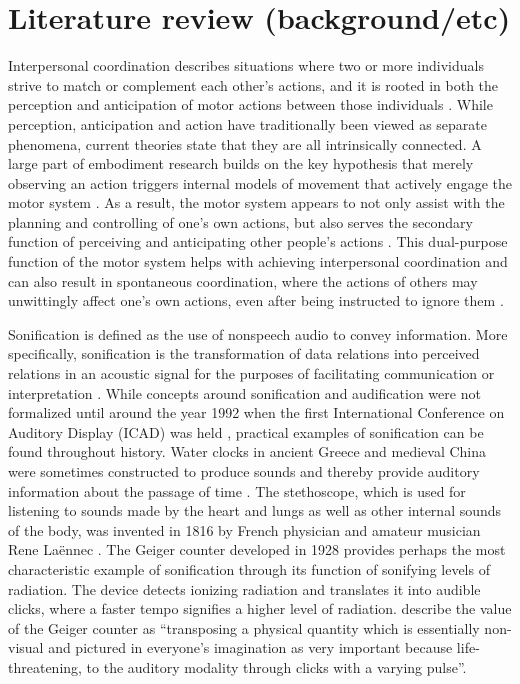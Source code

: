 \documentclass[10pt,a4paper,onecolumn]{article}
\begin{document}
\hypertarget{literature-review-backgroundetc}{%
\section{Literature review (background/etc)}\label{literature-review-backgroundetc}}

Interpersonal coordination describes situations where two or more individuals strive to match or complement each other's actions,
and it is rooted in both the perception and anticipation of motor actions between those individuals \autocite{gerdschmitzSoundJoinedActions2017}.
While perception, anticipation and action have traditionally been viewed as separate phenomena, current theories state that they are all intrinsically connected.
A large part of embodiment research builds on the key hypothesis that merely observing an action triggers internal models of
movement that actively engage the motor system \autocite{gerdschmitzSoundJoinedActions2017}.
As a result, the motor system appears to not only assist with the planning and controlling of one's own actions,
but also serves the secondary function of perceiving and anticipating other people's actions \autocite{gerdschmitzSoundJoinedActions2017}.
This dual-purpose function of the motor system helps with achieving interpersonal coordination and can also result in spontaneous coordination,
where the actions of others may unwittingly affect one's own actions, even after being instructed to ignore them \autocite{demosRockingBeatEffects2012}.

Sonification is defined as the use of nonspeech audio to convey information.
More specifically, sonification is the transformation of data relations into perceived relations in an acoustic
signal for the purposes of facilitating communication or interpretation \autocite{kramerSonificationReportStatus1999}.
While concepts around sonification and audification were not formalized until around the year 1992 when the first
International Conference on Auditory Display (ICAD) was held \autocite{dubusSonificationPhysicalQuantities2011}, practical examples of sonification can
be found throughout history. Water clocks in ancient Greece and medieval China were sometimes constructed to
produce sounds and thereby provide auditory information about the passage of time \autocite{dubusSonificationPhysicalQuantities2011}.
The stethoscope, which is used for listening to sounds made by the heart and lungs as well as other internal
sounds of the body, was invented in 1816 by French physician and amateur musician Rene Laënnec \autocite{roguinReneTheophileHyacinthe2006}.
The Geiger counter developed in 1928 provides perhaps the most characteristic example of sonification through
its function of sonifying levels of radiation. The device detects ionizing radiation and translates it into audible clicks,
where a faster tempo signifies a higher level of radiation. \textcite{dubusSonificationPhysicalQuantities2011} describe the value of the Geiger
counter as ``transposing a physical quantity which is essentially non-visual and pictured in everyone's imagination
as very important because life-threatening, to the auditory modality through clicks with a varying pulse''.
\end{document}
